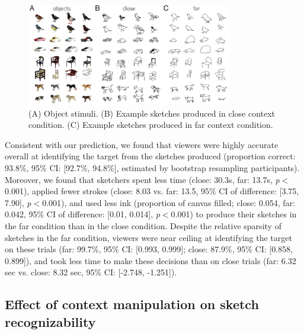 \documentclass[9pt,twocolumn,twoside]{pnas-new}
\begin{document}
\begin{figure}[htbp]
\centering
\includegraphics[width=0.8\textwidth]{figures/2_sketch_gallery.pdf}
\caption{(A) Object stimuli. (B) Example sketches produced in close context condition. (C) Example sketches produced in far context condition.}
\label{sketch_gallery}
\end{figure}


Consistent with our prediction, we found that viewers were highly accurate overall at identifying the target from the sketches produced (proportion correct: 93.8\%, 95\% CI: [92.7\%, 94.8\%], estimated by bootstrap resampling participants). 
Moreover, we found that sketchers spent less time (close: 30.3s, far: 13.7s, \textit{p}$<$0.001), applied fewer strokes (close: 8.03 vs. far: 13.5, 95\% CI of difference: [3.75, 7.90], \textit{p}$<$0.001), and used less ink (proportion of canvas filled; close: 0.054, far: 0.042, 95\% CI of difference: [0.01, 0.014], \textit{p}$<$0.001) to produce their sketches in the far condition than in the close condition. 
Despite the relative sparsity of sketches in the far condition, viewers were near ceiling at identifying the target on these trials (far: 99.7\%, 95\% CI: [0.993, 0.999]; close: 87.9\%, 95\% CI: [0.858, 0.899]), and took less time to make these decisions than on close trials (far: 6.32 sec vs. close: 8.32 sec, 95\% CI: [-2.748, -1.251]).

\subsection*{Effect of context manipulation on sketch recognizability}
\end{document}
